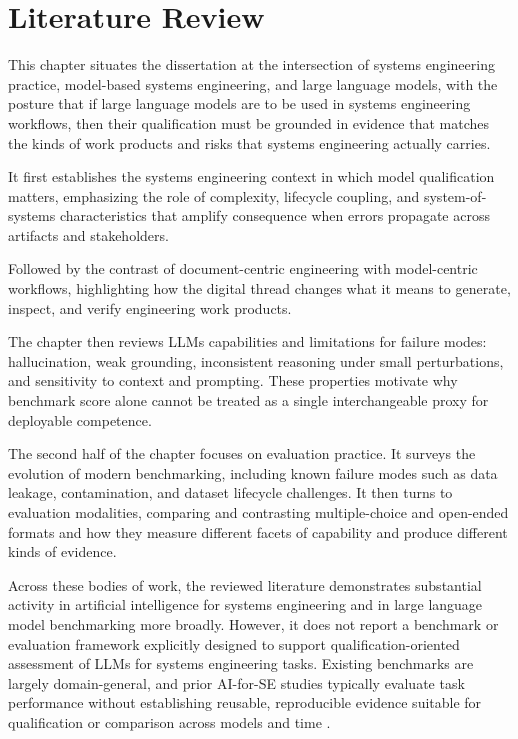 \chapter{Literature Review}\label{ch:literature_review}

This chapter situates the dissertation at the intersection of systems engineering practice, model-based systems engineering, and large language models, with the posture that if large language models are to be used in systems engineering workflows, then their qualification must be grounded in evidence that matches the kinds of work products and risks that systems engineering actually carries.

It first establishes the systems engineering context in which model qualification matters, emphasizing the role of complexity, lifecycle coupling, and system-of-systems characteristics that amplify consequence when errors propagate across artifacts and stakeholders. 

Followed by the contrast of document-centric engineering with model-centric workflows, highlighting how the digital thread changes what it means to generate, inspect, and verify engineering work products. 

The chapter then reviews LLMs capabilities and limitations for failure modes: hallucination, weak grounding, inconsistent reasoning under small perturbations, and sensitivity to context and prompting. These properties motivate why benchmark score alone cannot be treated as a single interchangeable proxy for deployable competence. 

The second half of the chapter focuses on evaluation practice. It surveys the evolution of modern benchmarking, including known failure modes such as data leakage, contamination, and dataset lifecycle challenges. It then turns to evaluation modalities, comparing and contrasting multiple-choice and open-ended formats and how they measure different facets of capability and produce different kinds of evidence. 

Across these bodies of work, the reviewed literature demonstrates substantial activity in artificial intelligence for systems engineering and in large language model benchmarking more broadly. However, it does not report a benchmark or evaluation framework explicitly designed to support qualification-oriented assessment of LLMs for systems engineering tasks. Existing benchmarks are largely domain-general, and prior AI-for-SE studies typically evaluate task performance without establishing reusable, reproducible evidence suitable for qualification or comparison across models and time \cite{serc_AI4SESE4AIWorkshop_2024, SERC_AI4SE_SE4AI_Research_Application_Workshop_Report_2025}.

